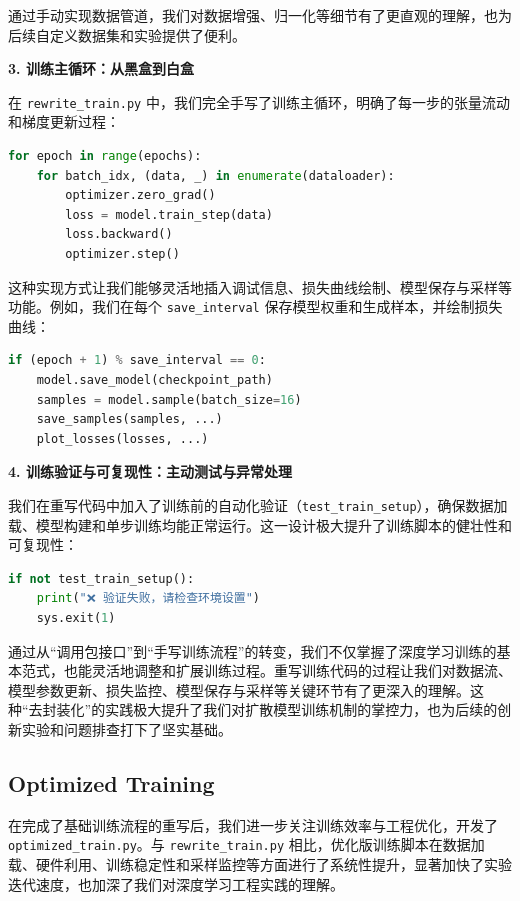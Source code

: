 \documentclass{ctexart}
\begin{document}
\noindent
通过手动实现数据管道，我们对数据增强、归一化等细节有了更直观的理解，也为后续自定义数据集和实验提供了便利。

\vspace{0.5em}
\noindent
\textbf{3. 训练主循环：从黑盒到白盒}

\noindent
在 \texttt{rewrite\_train.py} 中，我们完全手写了训练主循环，明确了每一步的张量流动和梯度更新过程：

\begin{lstlisting}[language=python]
for epoch in range(epochs):
    for batch_idx, (data, _) in enumerate(dataloader):
        optimizer.zero_grad()
        loss = model.train_step(data)
        loss.backward()
        optimizer.step()
\end{lstlisting}

\noindent
这种实现方式让我们能够灵活地插入调试信息、损失曲线绘制、模型保存与采样等功能。例如，我们在每个 \texttt{save\_interval} 保存模型权重和生成样本，并绘制损失曲线：

\begin{lstlisting}[language=python]
if (epoch + 1) % save_interval == 0:
    model.save_model(checkpoint_path)
    samples = model.sample(batch_size=16)
    save_samples(samples, ...)
    plot_losses(losses, ...)
\end{lstlisting}

\vspace{0.5em}
\noindent
\textbf{4. 训练验证与可复现性：主动测试与异常处理}

\noindent
我们在重写代码中加入了训练前的自动化验证（\texttt{test\_train\_setup}），确保数据加载、模型构建和单步训练均能正常运行。这一设计极大提升了训练脚本的健壮性和可复现性：

\begin{lstlisting}[language=python]
if not test_train_setup():
    print("❌ 验证失败，请检查环境设置")
    sys.exit(1)
\end{lstlisting}

\vspace{0.5em}

\noindent
通过从“调用包接口”到“手写训练流程”的转变，我们不仅掌握了深度学习训练的基本范式，也能灵活地调整和扩展训练过程。重写训练代码的过程让我们对数据流、模型参数更新、损失监控、模型保存与采样等关键环节有了更深入的理解。这种“去封装化”的实践极大提升了我们对扩散模型训练机制的掌控力，也为后续的创新实验和问题排查打下了坚实基础。


\subsection{Optimized Training}
\noindent
在完成了基础训练流程的重写后，我们进一步关注训练效率与工程优化，开发了 \texttt{optimized\_train.py}。与 \texttt{rewrite\_train.py} 相比，优化版训练脚本在数据加载、硬件利用、训练稳定性和采样监控等方面进行了系统性提升，显著加快了实验迭代速度，也加深了我们对深度学习工程实践的理解。
\end{document}
